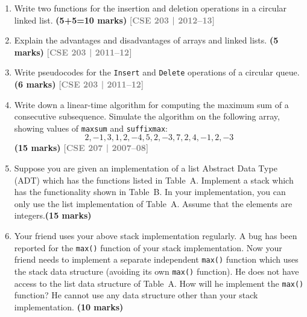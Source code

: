 \documentclass[12pt,a3paper]{article}
\newcommand{\yr}[1]{\hfill\textcolor{gray}{\small\textbf{[#1]}}}
\newcommand{\mk}[1]{\textcolor{orange!70!black}{\small\textbf{(#1 marks)}}}
\begin{document}
\begin{enumerate}
\item Write two functions for the insertion and deletion operations in a
circular linked list. \mk{5+5=10}
\yr{CSE 203 | 2012--13}

\item Explain the advantages and disadvantages of arrays and linked lists. \mk{5}
\yr{CSE 203 | 2011--12}

\item Write pseudocodes for the \texttt{Insert} and \texttt{Delete} operations
of a circular queue. \mk{6}
\yr{CSE 203 | 2011--12}

\item Write down a linear-time algorithm for computing the maximum sum of a
consecutive subsequence. Simulate the algorithm on the following array, showing
values of \texttt{maxsum} and \texttt{suffixmax}:
\[ 2, -1, 3, 1, 2, -4, 5, 2, -3, 7, 2, 4, -1, 2, -3 \]
\mk{15}
\yr{CSE 207 | 2007--08}


\item Suppose you are given an implementation of a list Abstract Data Type (ADT)
which has the functions listed in Table~A. Implement a stack which has the
functionality shown in Table~B. In your implementation, you can only use the list
implementation of Table~A. Assume that the elements are integers.\mk{15}

\item Your friend uses your above stack implementation regularly. A bug has been
reported for the \texttt{max()} function of your stack implementation. Now your
friend needs to implement a separate independent \texttt{max()} function which uses
the stack data structure (avoiding its own \texttt{max()} function). He does not
have access to the list data structure of Table~A. How will he implement the
\texttt{max()} function? He cannot use any data structure other than your stack
implementation. \mk{10}


\end{enumerate}
\end{document}
